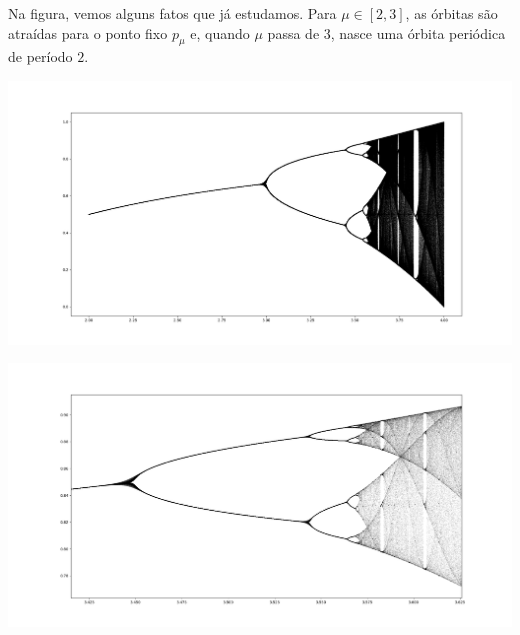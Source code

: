 Na figura, vemos alguns fatos que já estudamos. Para $\mu \in [2, 3]$, as órbitas são atraídas para o ponto fixo $p_\mu$ e, quando $\mu$ passa de $3$, nasce uma órbita periódica de período $2$. 

\begin{center}
\includegraphics[scale=0.3]{images/period-doubling.png}
\end{center}

\begin{center}
\includegraphics[scale=0.3]{images/period-doubling1.png}
\end{center}